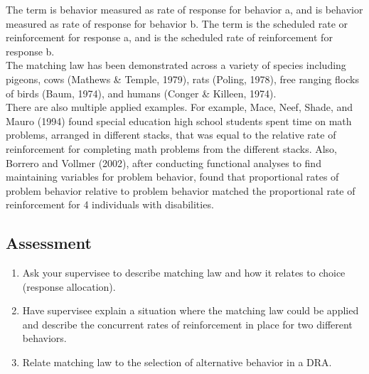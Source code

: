 The term  is behavior measured as rate of response for behavior a, and  is behavior measured as rate of response for behavior b. The term  is the scheduled rate or reinforcement for response a, and  is the scheduled rate of reinforcement for response b.\\

The matching law has been demonstrated across a variety of species including pigeons, cows (Mathews \& Temple, 1979), rats (Poling, 1978), free ranging flocks of birds (Baum, 1974), and humans (Conger \& Killeen, 1974). \\

There are also multiple applied examples. For example, Mace, Neef, Shade, and Mauro (1994) found special education high school students spent time on math problems, arranged in different stacks, that was equal to the relative rate of reinforcement for completing math problems from the different stacks. Also, Borrero and Vollmer (2002), after conducting functional analyses to find maintaining variables for problem behavior, found that proportional rates of problem behavior relative to problem behavior matched the proportional rate of reinforcement for 4 individuals with disabilities. 
%
\subsection{Assessment}
\begin{enumerate}
\item Ask your supervisee to describe matching law and how it relates to choice (response allocation).
\item Have supervisee explain a situation where the matching law could be applied and describe the concurrent rates of reinforcement in place for two different behaviors.
\item Relate matching law to the selection of alternative behavior in a DRA.
%
\end{enumerate}
%
